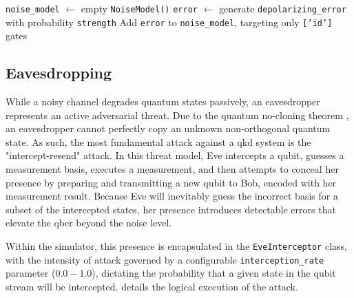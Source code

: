 \begin{algorithm}[H]
    \caption{AerSimulator Backend Generation for Channel Noise.}\label{alg:noise_model}
    \texttt{noise\_model} $\leftarrow$ empty \texttt{NoiseModel()}\;
    \texttt{error} $\leftarrow$ generate \texttt{depolarizing\_error} with probability \texttt{strength}\; 
    Add \texttt{error} to \texttt{noise\_model}, targeting only \texttt{['id']} gates\; 
\end{algorithm}

\newpage
\subsection{Eavesdropping}
\label{subsec:eavesdropping}
While a noisy channel degrades quantum states passively, an eavesdropper represents an active adversarial threat. Due to the quantum no-cloning theorem \cite{WZ1982}, an eavesdropper cannot perfectly copy an unknown non-orthogonal quantum state. As such, the most fundamental attack against a \gls{qkd} system is the "intercept-resend" attack. In this threat model, Eve intercepts a \gls{qubit}, guesses a measurement basis, executes a measurement, and then attempts to conceal her presence by preparing and transmitting a new \gls{qubit} to Bob, encoded with her measurement result. Because Eve will inevitably guess the incorrect basis for a subset of the intercepted states, her presence introduces detectable errors that elevate the \gls{qber} beyond the noise level.
 
Within the simulator, this presence is encapsulated in the \texttt{EveInterceptor} class, with the intensity of attack governed by a configurable \texttt{interception\_rate} parameter ($0.0-1.0$), dictating the probability that a given state in the \gls{qubit} stream will be intercepted.  details the logical execution of the attack.

